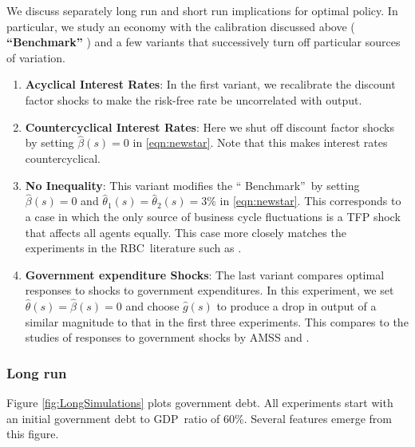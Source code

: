 \documentclass[thmsb,11pt]{article}
\begin{document}
\smallskip

\smallskip We discuss separately  long run and  short run implications
for  optimal policy. In particular, we  study an economy  with the calibration discussed above (\textbf{%
``Benchmark''} ) and a few variants
that successively turn off particular sources of variation.

\begin{enumerate}
\item \textbf{Acyclical Interest Rates}: In the first variant, we recalibrate
the discount factor shocks to make the risk-free rate be uncorrelated with
output.

\item \textbf{Countercyclical Interest Rates}: Here we shut off  discount
factor shocks by setting $\hat{\beta}\left( s\right) =0$ in \eqref{eqn:newstar}. Note that this makes  interest rates  countercyclical.

\item \textbf{No Inequality}: This variant modifies the \textquotedblleft
Benchmark\textquotedblright\ by setting $\hat{\beta}\left( s\right) =0$ and $%
{\hat{\theta}}_{1}(s)={\hat{\theta}}_{2}(s)=3\%$ in \eqref{eqn:newstar}. This corresponds to a case
in which the only source of business cycle fluctuations is a TFP shock that
affects all agents equally. This case more closely matches the experiments
in the RBC\ literature such as \cite{Chari1994}.

\item \textbf{Government expenditure Shocks}: The last variant compares  optimal
responses to shocks to government expenditures. In this experiment, we set
$\hat{\theta}\left( s\right) =\hat{\beta}\left( s\right) =0$ and choose $%
\hat{g}\left( s\right) $ to produce a drop in output of a similar magnitude
to that in the first three experiments. This compares to the studies of
responses to government shocks by AMSS and \cite{Faraglia2011}.
\end{enumerate}

\subsubsection{Long run}

Figure \ref{fig:LongSimulations} plots government  debt. All
experiments start with an initial government debt to GDP\ ratio of 60\%. Several
features emerge from this figure. %
\end{document}
